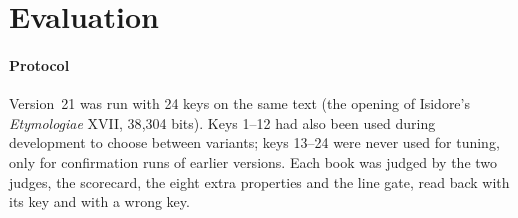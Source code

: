 \section{Evaluation}
\label{sec:evaluation}

\paragraph{Protocol} Version~21 was run with 24 keys on the same text (the opening of Isidore's \emph{Etymologiae}
XVII, 38{,}304 bits). Keys 1--12 had also been used during development to choose between variants; keys 13--24 were never
used for tuning, only for confirmation runs of earlier versions. Each book was judged by the two judges, the scorecard, the eight extra properties and the line gate, read back with
its key and with a wrong key.


